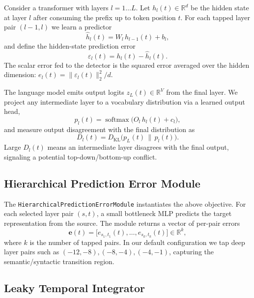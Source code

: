 \documentclass[letterpaper]{article}
\begin{document}
Consider a transformer with layers $l = 1 \dots L$. Let $h_l(t) \in \mathbb{R}^d$ be the hidden state at layer $l$ after consuming the prefix up to token position $t$. For each tapped layer pair $(l-1, l)$ we learn a predictor
\begin{equation}
    \hat{h}_l(t) = W_l \, h_{l-1}(t) + b_l,
\end{equation}
and define the hidden-state prediction error
\begin{equation}
    \varepsilon_l(t) = h_l(t) - \hat{h}_l(t).
\end{equation}
The scalar error fed to the detector is the squared error averaged over the hidden dimension: $e_l(t) = \|\varepsilon_l(t)\|_2^2 / d$.

The language model emits output logits $z_L(t) \in \mathbb{R}^V$ from the final layer. We project any intermediate layer to a vocabulary distribution via a learned output head,
\begin{equation}
    p_l(t) = \operatorname{softmax}\bigl(O_l \, h_l(t) + c_l\bigr),
\end{equation}
and measure output disagreement with the final distribution as
\begin{equation}
    D_l(t) = D_{\mathrm{KL}}\bigl(p_L(t) \,\|\, p_l(t)\bigr).
\end{equation}
Large $D_l(t)$ means an intermediate layer disagrees with the final output, signaling a potential top-down/bottom-up conflict.

\subsection{Hierarchical Prediction Error Module}

The \texttt{HierarchicalPredictionErrorModule} instantiates the above objective. For each selected layer pair $(s, t)$, a small bottleneck MLP predicts the target representation from the source. The module returns a vector of per-pair errors
\begin{equation}
    \mathbf{e}(t) = \bigl[e_{s_1,t_1}(t), \dots, e_{s_k,t_k}(t)\bigr] \in \mathbb{R}^k,
\end{equation}
where $k$ is the number of tapped pairs. In our default configuration we tap deep layer pairs such as $(-12,-8), (-8,-4), (-4,-1)$, capturing the semantic/syntactic transition region.

\subsection{Leaky Temporal Integrator}
\end{document}
